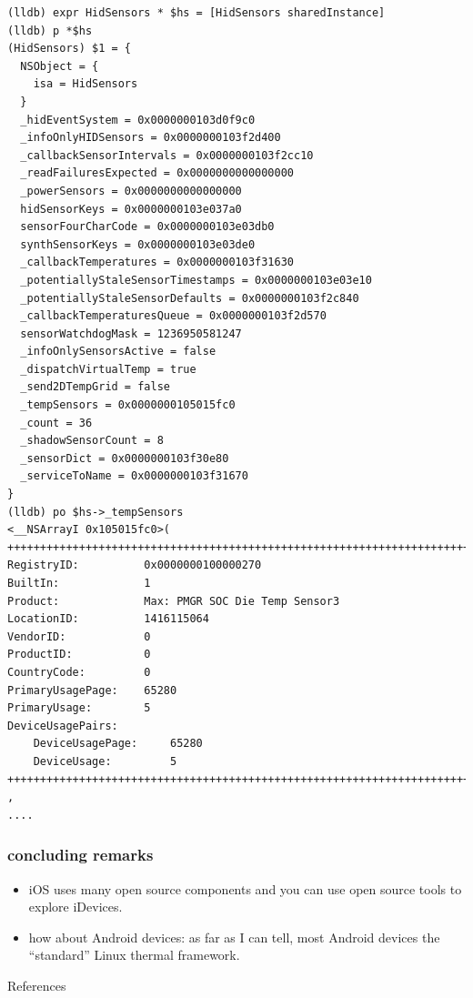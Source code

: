 \documentclass{beamer}
\begin{document}
\begin{frame}
  \begin{lstlisting}[caption=''HidSensors'',label=HidSensors]
(lldb) expr HidSensors * $hs = [HidSensors sharedInstance]
(lldb) p *$hs
(HidSensors) $1 = {
  NSObject = {
    isa = HidSensors
  }
  _hidEventSystem = 0x0000000103d0f9c0
  _infoOnlyHIDSensors = 0x0000000103f2d400
  _callbackSensorIntervals = 0x0000000103f2cc10
  _readFailuresExpected = 0x0000000000000000
  _powerSensors = 0x0000000000000000
  hidSensorKeys = 0x0000000103e037a0
  sensorFourCharCode = 0x0000000103e03db0
  synthSensorKeys = 0x0000000103e03de0
  _callbackTemperatures = 0x0000000103f31630
  _potentiallyStaleSensorTimestamps = 0x0000000103e03e10
  _potentiallyStaleSensorDefaults = 0x0000000103f2c840
  _callbackTemperaturesQueue = 0x0000000103f2d570
  sensorWatchdogMask = 1236950581247
  _infoOnlySensorsActive = false
  _dispatchVirtualTemp = true
  _send2DTempGrid = false
  _tempSensors = 0x0000000105015fc0
  _count = 36
  _shadowSensorCount = 8
  _sensorDict = 0x0000000103f30e80
  _serviceToName = 0x0000000103f31670
}
(lldb) po $hs->_tempSensors
<__NSArrayI 0x105015fc0>(
+++++++++++++++++++++++++++++++++++++++++++++++++++++++++++++++++++++++++++
RegistryID:          0x0000000100000270
BuiltIn:             1
Product:             Max: PMGR SOC Die Temp Sensor3
LocationID:          1416115064
VendorID:            0
ProductID:           0
CountryCode:         0
PrimaryUsagePage:    65280
PrimaryUsage:        5
DeviceUsagePairs:   
    DeviceUsagePage:     65280
    DeviceUsage:         5
+++++++++++++++++++++++++++++++++++++++++++++++++++++++++++++++++++++++++++
,
....    
  \end{lstlisting}
  \normalsize
\end{frame}

\begin{frame}
  \frametitle{concluding remarks}
  \begin{itemize}
  \item iOS uses many open source components and you can use open source tools to explore iDevices.
  \item how about Android devices: as far as I can tell, most Android devices the ``standard'' Linux thermal framework.
  \end{itemize}
\end{frame}

\begin{frame}[allowframebreaks]
  \begin{block}{References}
    \tiny
    
    
  \end{block} 
\end{frame}
\end{document}
